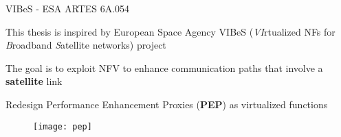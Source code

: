 \begin{frame}{VIBeS - ESA ARTES  6A.054}

  This thesis is inspired by European Space Agency VIBeS (\emph{VI}rtualized NFs for \emph{B}roadband \emph{S}atellite networks) project

  \vfill{}

  The goal is to exploit NFV to enhance communication paths that involve
  a \textbf{satellite} link

  \vfill{}

  Redesign Performance Enhancement Proxies (\textbf{PEP}) as virtualized
  functions

  \vfill{}

  \begin{figure}
    \centering
    \texttt{[image: pep]}
  \end{figure}

\end{frame}